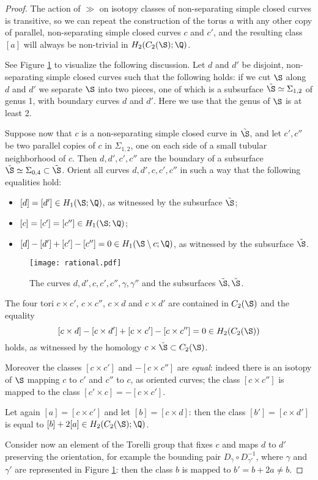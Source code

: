 \begin{proof}
The action of $\gg$ on isotopy classes of non-separating simple closed curves is transitive, so we can repeat
the construction of the torus $a$ with any other copy of parallel, non-separating simple closed curves
$c$ and $c'$, and the resulting class $[a]$ will always be non-trivial in $H_2(C_2(\S);\Q)$.

See Figure \ref{fig:rational} to visualize the following discussion.
Let $d$ and $d'$ be disjoint, non-separating simple closed curves such that
the following holds: if we cut $\S$ along $d$ and $d'$ we separate $\S$ into two pieces, one of
which is a subsurface $\tilde{\S}\simeq\Sigma_{1,2}$ of genus 1, with boundary
curves $d$ and $d'$. Here we use that the genus of $\S$ is at least 2.

Suppose now that $c$ is a non-separating simple closed curve in $\tilde{\S}$,
and let $c',c''$ be two parallel copies of $c$ in $\Sigma_{1,2}$, one on each side of a small tubular
neighborhood of $c$.
Then $d,d',c',c''$ are the boundary of a subsurface $\check{\S}\simeq\Sigma_{0,4}\subset\tilde{\S}$.
Orient all curves $d,d',c,c',c''$ in such a way that the following equalities hold:
\begin{itemize}
 \item $[d]=[d']\in H_1(\S;\Q)$, as witnessed by the subsurface $\tilde{\S}$;
 \item $[c]=[c']=[c'']\in H_1(\S;\Q)$;
 \item $[d]-[d']+[c']-[c'']=0\in H_1(\S\setminus c;\Q)$, as witnessed by the subsurface $\check{\S}$.
\end{itemize}

\begin{figure}\centering
 \texttt{[image: rational.pdf]}
 \caption{The curves $d,d',c,c',c'',\gamma,\gamma''$ and the subsurfaces $\tilde{\S},\check{\S}$.}
\label{fig:rational}
\end{figure}

The four tori $c\times c'$, $c\times c''$, $c\times d$ and $c\times d'$ are contained in $C_2(\S)$
and the equality
\[
 [c\times d]-[c\times d']+[c\times c']-[c\times c'']=0\in H_2(C_2(\S))
\]
holds, as witnessed by the homology $c\times \check{\S}\subset C_2(\S)$.

Moreover the classes $[c\times c']$ and $-[c\times c'']$ are \emph{equal}:
indeed there is an isotopy of $\S$ mapping $c$ to $c'$ and $c''$ to $c$,
as oriented curves; the class $[c\times c'']$ is mapped to the class $[c'\times c]=-[c\times c']$.

Let again $[a]=[c\times c']$ and let $[b]=[c\times d]$: then the class $[b']=[c\times d']$
is equal to $[b]+2[a]\in H_2(C_2(\S);\Q)$.

Consider now an element of the Torelli group that fixes $c$ and maps $d$ to $d'$ preserving
the orientation, for example the bounding pair $D_{\gamma}\circ D_{\gamma'}^{-1}$, where
$\gamma$ and $\gamma'$ are represented in Figure \ref{fig:rational}:
then the class $b$ is mapped to $b'=b+2a\neq b$.
\end{proof}

